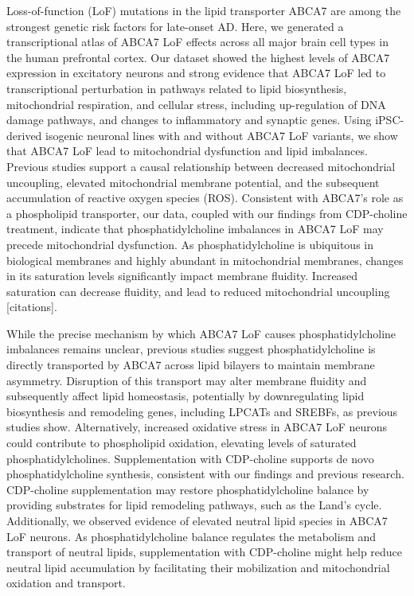 
Loss-of-function (LoF) mutations in the lipid transporter ABCA7 are among the strongest genetic risk factors for late-onset AD. Here, we generated a transcriptional atlas of ABCA7 LoF effects across all major brain cell types in the human prefrontal cortex. Our dataset showed the highest levels of ABCA7 expression in excitatory neurons and strong evidence that ABCA7 LoF led to transcriptional perturbation in pathways related to lipid biosynthesis, mitochondrial respiration, and cellular stress, including up-regulation of DNA damage pathways, and changes to inflammatory and synaptic genes. Using iPSC-derived isogenic neuronal lines with and without ABCA7 LoF variants, we show that ABCA7 LoF lead to mitochondrial dysfunction and lipid imbalances.  Previous studies support a causal relationship between decreased mitochondrial uncoupling, elevated mitochondrial membrane potential, and the subsequent accumulation of reactive oxygen species (ROS). Consistent with ABCA7's role as a phospholipid transporter, our data, coupled with our findings from CDP-choline treatment, indicate that phosphatidylcholine imbalances in ABCA7 LoF may precede mitochondrial dysfunction. As phosphatidylcholine is ubiquitous in biological membranes and highly abundant in mitochondrial membranes, changes in its saturation levels significantly impact membrane fluidity. Increased saturation can decrease fluidity, and lead to reduced mitochondrial uncoupling [citations].

While the precise mechanism by which ABCA7 LoF causes phosphatidylcholine imbalances remains unclear, previous studies suggest phosphatidylcholine is directly transported by ABCA7 across lipid bilayers to maintain membrane asymmetry. Disruption of this transport may alter membrane fluidity and subsequently affect lipid homeostasis, potentially by downregulating lipid biosynthesis and remodeling genes, including LPCATs and SREBFs, as previous studies show. Alternatively, increased oxidative stress in ABCA7 LoF neurons could contribute to phospholipid oxidation, elevating levels of saturated phosphatidylcholines. Supplementation with CDP-choline supports de novo phosphatidylcholine synthesis, consistent with our findings and previous research. CDP-choline supplementation may restore phosphatidylcholine balance by providing substrates for lipid remodeling pathways, such as the Land’s cycle. Additionally, we observed evidence of elevated neutral lipid species in ABCA7 LoF neurons. As phosphatidylcholine balance regulates the metabolism and transport of neutral lipids, supplementation with CDP-choline might help reduce neutral lipid accumulation by facilitating their mobilization and mitochondrial oxidation and transport. 

